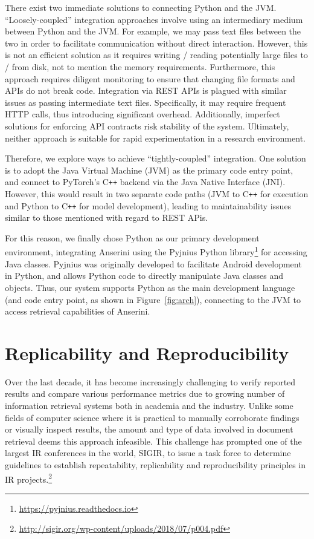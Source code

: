 There exist two immediate solutions to connecting Python and the JVM.
``Loosely-coupled'' integration approaches involve using an intermediary medium between Python and the JVM.
For example, we may pass text files between the two in order to facilitate communication without direct interaction.
However, this is not an efficient solution as it requires writing / reading potentially large files to / from disk, not to mention the memory requirements.
Furthermore, this approach requires diligent monitoring to ensure that changing file formats and APIs do not break code.
Integration via REST APIs is plagued with similar issues as passing intermediate text files.
Specifically, it may require frequent HTTP calls, thus introducing significant overhead.
Additionally, imperfect solutions for enforcing API contracts risk stability of the system.
Ultimately, neither approach is suitable for rapid experimentation in a research environment.

Therefore, we explore ways to achieve ``tightly-coupled'' integration.
One solution is to adopt the Java Virtual Machine (JVM) as the primary code entry point, and connect to PyTorch's C\texttt{++} backend via the Java Native Interface (JNI).
However, this would result in two separate code paths (JVM to C\texttt{++} for execution and Python to C\texttt{++} for model development), leading to maintainability issues similar to those mentioned with regard to REST APis.

For this reason, we finally chose Python as our primary development environment, integrating Anserini using the Pyjnius Python library\footnote{\url{https://pyjnius.readthedocs.io}} for accessing Java classes.
Pyjnius was originally developed to facilitate Android development in Python, and allows Python code to directly manipulate Java classes and objects.
Thus, our system supports Python as the main development language (and code entry point, as shown in Figure~\ref{fig:arch}), connecting to the JVM to access retrieval capabilities of Anserini.

\section{Replicability and Reproducibility}

Over the last decade, it has become increasingly challenging to verify reported results and compare various performance metrics due to growing number of information retrieval systems both in academia and the industry.
Unlike some fields of computer science where it is practical to manually corroborate findings or visually inspect results, the amount and type of data involved in document retrieval deems this approach infeasible.
This challenge has prompted one of the largest IR conferences in the world, SIGIR, to issue a task force to determine guidelines to establish repeatability, replicability and reproducibility principles in IR projects.\footnote{\url{http://sigir.org/wp-content/uploads/2018/07/p004.pdf}}

